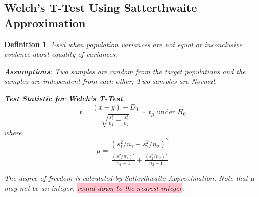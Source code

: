 \documentclass[a4paper,11pt]{article}
\newtheorem{defn}[thm]{Definition}
\begin{document}
\subsection{Welch's T-Test Using Satterthwaite Approximation}
\begin{defn}
\normalfont
Used when population variances are not equal or inconclusive evidence about equality of variances. 

\textbf{Assumptions}: Two samples are random from the target populations and the samples are independent from each other; Two samples are Normal. 

\textbf{Test Statistic for Welch's T-Test}
$$t=\frac{(\bar{x}-\bar{y})-D_0}{\sqrt{\frac{s_1^2}{n_1}+\frac{s_2^2}{n_2}}}\sim t_{\mu}\text{ under }H_0$$
where
$$\mu=\frac{(s_1^2/n_1+s_2^2/n_2)^2}{\frac{(s_1^2/n_1)^2}{n_1-1}+\frac{(s_2^2/n_2)^2}{n_2-1}}$$

The degree of freedom is calculated by Satterthwaite Approximation. Note that $\mu$ may not be an integer, \colorbox{pink}{round down to the nearest integer}. 
\end{defn}
\newpage
\end{document}
